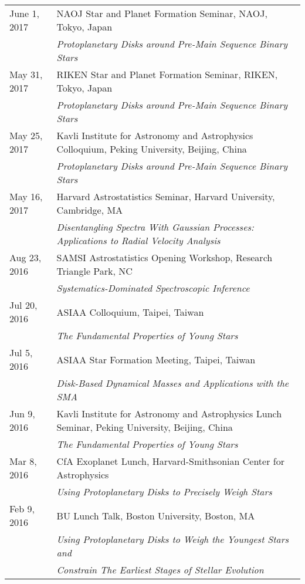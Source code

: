 \documentclass[10pt]{article}
\newcommand{\rowskip}{1.2mm}
\begin{document}
\begin{tabular*}{\textwidth}{@{\hspace{10pt}}p{1.2in}l}
  June 1, 2017 & NAOJ Star and Planet Formation Seminar, NAOJ, Tokyo, Japan \\
  & \emph{Protoplanetary Disks around Pre-Main Sequence Binary Stars} \\[\rowskip]
  May 31, 2017 & RIKEN Star and Planet Formation Seminar, RIKEN, Tokyo, Japan \\
  & \emph{Protoplanetary Disks around Pre-Main Sequence Binary Stars} \\[\rowskip]
  May 25, 2017 & Kavli Institute for Astronomy and Astrophysics Colloquium, Peking University, Beijing, China \\
  & \emph{Protoplanetary Disks around Pre-Main Sequence Binary Stars} \\[\rowskip]
  May 16, 2017 & Harvard Astrostatistics Seminar, Harvard University, Cambridge, MA \\
  & \emph{Disentangling Spectra With Gaussian Processes: Applications to Radial Velocity Analysis} \\[\rowskip]
  Aug 23, 2016 & SAMSI Astrostatistics Opening Workshop, Research Triangle Park, NC \\
  & \emph{Systematics-Dominated Spectroscopic Inference} \\[\rowskip]
  Jul 20, 2016 & ASIAA Colloquium, Taipei, Taiwan \\
  & \emph{The Fundamental Properties of Young Stars} \\[\rowskip]
  Jul 5, 2016 & ASIAA Star Formation Meeting, Taipei, Taiwan \\
  & \emph{Disk-Based Dynamical Masses and Applications with the SMA} \\[\rowskip]
  Jun 9, 2016 & Kavli Institute for Astronomy and Astrophysics Lunch Seminar, Peking University, Beijing, China \\
  & \emph{The Fundamental Properties of Young Stars} \\[\rowskip]
  Mar 8, 2016 & CfA Exoplanet Lunch, Harvard-Smithsonian Center for Astrophysics \\
  & \emph{Using Protoplanetary Disks to Precisely Weigh Stars} \\[\rowskip]
  Feb 9, 2016 & BU Lunch Talk, Boston University, Boston, MA \\
  & \emph{Using Protoplanetary Disks to Weigh the Youngest Stars and} \\
  & \emph{Constrain The Earliest Stages of Stellar Evolution} \\[\rowskip]
\end{tabular*}
\end{document}
